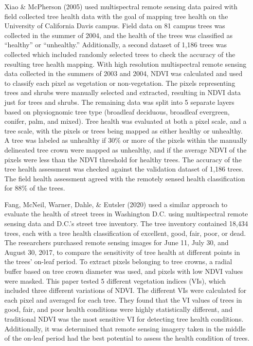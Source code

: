 \documentclass[12pt,twoside]{reedthesis}
\begin{document}
Xiao \& McPherson (2005) used multispectral remote sensing data paired with field
collected tree health data with the goal of mapping tree health on the
University of California Davis campus. Field data on 81 campus trees was
collected in the summer of 2004, and the health of the trees was
classified as ``healthy'' or ``unhealthy.'' Additionally, a second dataset
of 1,186 trees was collected which included randomly selected trees to
check the accuracy of the resulting tree health mapping. With high
resolution multispectral remote sensing data collected in the summers of
2003 and 2004, NDVI was calculated and used to classify each pixel as
vegetation or non-vegetation. The pixels representing trees and shrubs
were manually selected and extracted, resulting in NDVI data just for
trees and shrubs. The remaining data was split into 5 separate layers
based on physiognomic tree type (broadleaf deciduous, broadleaf
evergreen, conifer, palm, and mixed). Tree health was evaluated at both
a pixel scale, and a tree scale, with the pixels or trees being mapped
as either healthy or unhealthy. A tree was labeled as unhealthy if 30\%
or more of the pixels within the manually delineated tree crown were
mapped as unhealthy, and if the average NDVI of the pixels were less
than the NDVI threshold for healthy trees. The accuracy of the tree
health assessment was checked against the validation dataset of 1,186
trees. The field health assessment agreed with the remotely sensed
health classification for 88\% of the trees.

Fang, McNeil, Warner, Dahle, \& Eutsler (2020) used a similar approach to evaluate the health of street trees
in Washington D.C. using multispectral remote sensing data and D.C.'s
street tree inventory. The tree inventory contained 18,434 trees, each
with a tree health classification of excellent, good, fair, poor, or
dead. The researchers purchased remote sensing images for June 11, July
30, and August 30, 2017, to compare the sensitivity of tree health at
different points in the trees' on-leaf period. To extract pixels
belonging to tree crowns, a radial buffer based on tree crown diameter
was used, and pixels with low NDVI values were masked. This paper tested
5 different vegetation indices (VIs), which included three different
variations of NDVI. The different VIs were calculated for each pixel and
averaged for each tree. They found that the VI values of trees in good,
fair, and poor health conditions were highly statistically different,
and traditional NDVI was the most sensitive VI for detecting tree health
conditions. Additionally, it was determined that remote sensing imagery
taken in the middle of the on-leaf period had the best potential to
assess the health condition of trees.
\end{document}

